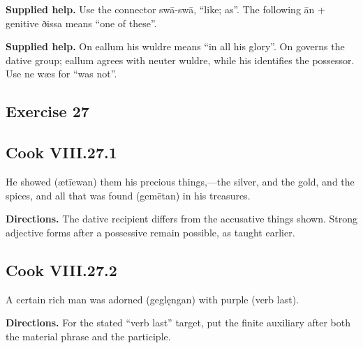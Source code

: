 \textbf{Supplied help.} Use the connector swā-swā, “like; as”. The following ān + genitive ðissa means “one of these”.

\textbf{Supplied help.} On eallum his wuldre means “in all his glory”. On governs the dative group; eallum agrees with neuter wuldre, while his identifies the possessor. Use ne wæs for “was not”.

\subsection*{Exercise 27}

\par\begin{minipage}{\linewidth}\raggedright
\subsection*{Cook VIII.27.1}

He showed (ætīewan) them his precious things,—the silver, and the gold, and the spices, and all that was found (gemētan) in his treasures.

\textbf{Directions.} The dative recipient differs from the accusative things shown. Strong adjective forms after a possessive remain possible, as taught earlier.

\end{minipage}\par\addvspace{4pt}

\par\begin{minipage}{\linewidth}\raggedright
\subsection*{Cook VIII.27.2}

A certain rich man was adorned (geglęngan) with purple (verb last).

\textbf{Directions.} For the stated “verb last” target, put the finite auxiliary after both the material phrase and the participle.

\end{minipage}\par\addvspace{4pt}

